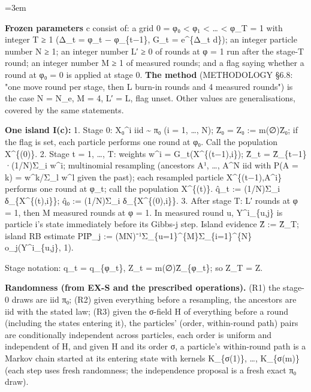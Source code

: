 \documentclass[11pt]{report}
\newenvironment{mdblock}{\begingroup\mdfont\raggedright\setlength{\parindent}{0pt}\setlength{\parskip}{0.55em}\emergencystretch=3em}{\par\endgroup}
\newcommand{\mdhead}[2]{\par\vspace{0.7em}\noindent{\bfseries\ifcase#1\or\large\or\normalsize\or\normalsize\or\small\or\small\or\small\fi #2}\par\nopagebreak\vspace{0.1em}}
\begin{document}
\begin{mdblock}
\mdhead{2}{2. The frozen run with fixed parameters}

\textbf{Frozen parameters} c consist of: a grid 0 = φ₀ < φ₁ < … < φ\_T = 1 with integer T ≥ 1 (Δ\_t = φ\_t − φ\_\{t−1\}, G\_t = e\textasciicircum{}\{Δ\_t d\}); an integer particle number N ≥ 1; an integer number L′ ≥ 0 of rounds at φ = 1 run after the stage-T round; an integer number M ≥ 1 of measured rounds; and a flag saying whether a round at φ₀ = 0 is applied at stage 0. \textbf{The method} (METHODOLOGY §6.8: "one move round per stage, then L burn-in rounds and 4 measured rounds") is the case N = N\_e, M = 4, L′ = L, flag unset. Other values are generalisations, covered by the same statements.

\textbf{One island I(c):} 1. Stage 0: X₀\textasciicircum{}i iid \textasciitilde{} π₀ (i = 1, …, N); Ẑ₀ = Z₀ := m(∅)Z̄₀; if the flag is set, each particle performs one round at φ₀. Call the population X\textasciicircum{}\{(0)\}. 2. Stage t = 1, …, T: weights w\textasciicircum{}i = G\_t(X\textasciicircum{}\{(t−1),i\}); Ẑ\_t = Ẑ\_\{t−1\}·(1/N)Σ\_i w\textasciicircum{}i; multinomial resampling (ancestors A¹, …, A\textasciicircum{}N iid with P(A = k) = w\textasciicircum{}k/Σ\_l w\textasciicircum{}l given the past); each resampled particle X\textasciicircum{}\{(t−1),A\textasciicircum{}i\} performs one round at φ\_t; call the population X\textasciicircum{}\{(t)\}. q̂\_t := (1/N)Σ\_i δ\_\{X\textasciicircum{}\{(t),i\}\}; q̂₀ := (1/N)Σ\_i δ\_\{X\textasciicircum{}\{(0),i\}\}. 3. After stage T: L′ rounds at φ = 1, then M measured rounds at φ = 1. In measured round u, Y\textasciicircum{}i\_\{u,j\} is particle i's state immediately before its Gibbs-j step. Island evidence Ẑ := Ẑ\_T; island RB estimate PIP̂\_j := (MN)⁻¹Σ\_\{u=1\}\textasciicircum{}\{M\}Σ\_\{i=1\}\textasciicircum{}\{N\} o\_j(Y\textasciicircum{}i\_\{u,j\}, 1).

Stage notation: q\_t = q\_\{φ\_t\}, Z\_t = m(∅)Z̄\_\{φ\_t\}; so Z\_T = Z.

\textbf{Randomness (from EX-S and the prescribed operations).} (R1) the stage-0 draws are iid π₀; (R2) given everything before a resampling, the ancestors are iid with the stated law; (R3) given the σ-field H of everything before a round (including the states entering it), the particles' (order, within-round path) pairs are conditionally independent across particles, each order is uniform and independent of H, and given H and its order σ, a particle's within-round path is a Markov chain started at its entering state with kernels K\_\{σ(1)\}, …, K\_\{σ(m)\} (each step uses fresh randomness; the independence proposal is a fresh exact π₀ draw).


\end{mdblock}
\end{document}
